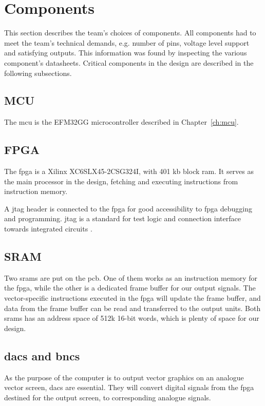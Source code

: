 \section{Components}
This section describes the team's choices of components.
All components had to meet the team's technical demands, e.g. number of pins, voltage level support and satisfying outputs.
This information was found by inspecting the various component's datasheets.
Critical components in the design are described in the following subsections.

\subsection{MCU}
The \gls{mcu} is the EFM32GG microcontroller described in Chapter~\ref{ch:mcu}.

\subsection{FPGA}
The \gls{fpga} is a Xilinx XC6SLX45-2CSG324I, with 401 kb block \gls{ram}.
It serves as the main processor in the design, fetching and executing instructions from instruction memory.

A \gls{jtag} header is connected to the \gls{fpga} for good accessibility to \gls{fpga} debugging and programming.
\gls{jtag} is a standard for test logic and connection interface towards integrated circuits \cite{jtag}.

\subsection{SRAM}
Two \gls{sram}s are put on the \gls{pcb}.
One of them works as an instruction memory for the \gls{fpga}, while the other is a dedicated frame buffer for our output signals.
The vector-specific instructions executed in the \gls{fpga} will update the frame buffer, and data from the frame buffer can be read and transferred to the output units.
Both \gls{sram}s has an address space of 512k 16-bit words, which is plenty of space for our design.

\subsection{\gls{dac}s and \gls{bnc}s}
As the purpose of the computer is to output vector graphics on an analogue vector screen, \gls{dac}s are essential.
They will convert digital signals from the \gls{fpga} destined for the output screen, to corresponding analogue signals.

